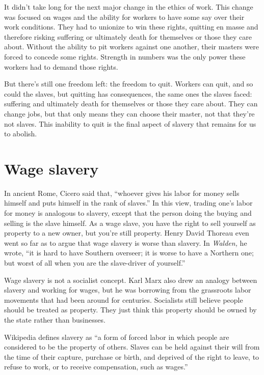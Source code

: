 It didn't take long for the next major change in the ethics of work. This change was focused on wages and the ability for workers to have some say over their work conditions. They had to unionize to win these rights, quitting en masse and therefore risking suffering or ultimately death for themselves or those they care about. Without the ability to pit workers against one another, their masters were forced to concede some rights. Strength in numbers was the only power these workers had to demand those rights.

But there's still one freedom left: the freedom to quit. Workers can quit, and so could the slaves, but quitting has consequences, the same ones the slaves faced: suffering and ultimately death for themselves or those they care about. They can change jobs, but that only means they can choose their master, not that they're not slaves. This inability to quit is the final aspect of slavery that remains for us to abolish.

\section{Wage slavery}
In ancient Rome, Cicero said that, ``whoever gives his labor for money sells himself and puts himself in the rank of slaves.''\cite{cicero} In this view, trading one's labor for money is analogous to slavery, except that the person doing the buying and selling is the slave himself. As a wage slave, you have the right to sell yourself as property to a new owner, but you're still property. Henry David Thoreau even went so far as to argue that wage slavery is worse than slavery. In \emph{Walden,} he wrote, ``it is hard to have Southern overseer; it is worse to have a Northern one; but worst of all when you are the slave-driver of yourself.''\cite{walden}

Wage slavery is not a socialist concept. Karl Marx also drew an analogy between slavery and working for wages\cite{marx}, but he was borrowing from the grassroots labor movements that had been around for centuries. Socialists still believe people should be treated as property. They just think this property should be owned by the state rather than businesses.

Wikipedia defines slavery as ``a form of forced labor in which people are considered to be the property of others. Slaves can be held against their will from the time of their capture, purchase or birth, and deprived of the right to leave, to refuse to work, or to receive compensation, such as wages.''\cite{wikipedia-slavery}

